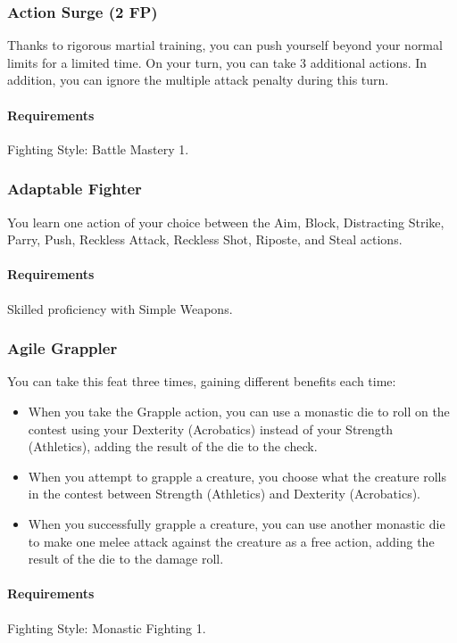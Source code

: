 \subsubsection{Action Surge (2 FP)} \label{feat::actionsurge}
    Thanks to rigorous martial training, you can push yourself beyond your normal limits for a limited time.
    On your turn, you can take 3 additional actions.
    In addition, you can ignore the multiple attack penalty during this turn.
    \paragraph{Requirements} Fighting Style: Battle Mastery 1.
\subsubsection{Adaptable Fighter} \label{feat::adaptablefighter}
    You learn one action of your choice between the Aim, Block, Distracting Strike, Parry, Push, Reckless Attack, Reckless Shot, Riposte, and Steal actions.
    \paragraph{Requirements} Skilled proficiency with Simple Weapons.
\subsubsection{Agile Grappler} \label{feat::agilegrappler}
    You can take this feat three times, gaining different benefits each time:
    \begin{itemize}
        \item When you take the Grapple action, you can use a monastic die to roll on the contest using your Dexterity (Acrobatics) instead of your Strength (Athletics), adding the result of the die to the check.
        \item When you attempt to grapple a creature, you choose what the creature rolls in the contest between Strength (Athletics) and Dexterity (Acrobatics).
        \item When you successfully grapple a creature, you can use another monastic die to make one melee attack against the creature as a free action, adding the result of the die to the damage roll.
    \end{itemize}
    \paragraph{Requirements} Fighting Style: Monastic Fighting 1.

